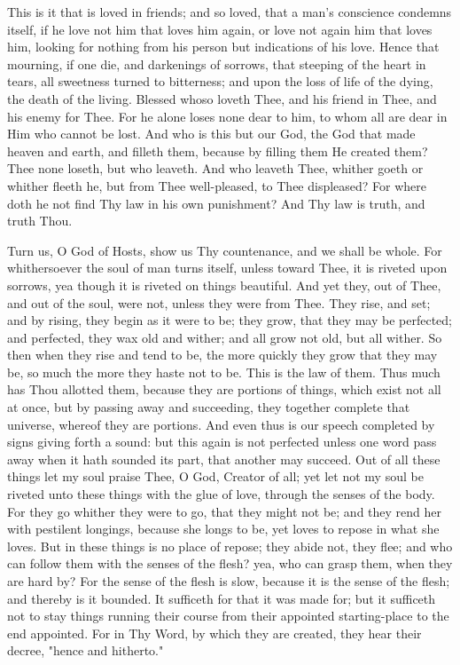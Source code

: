 \documentclass[b5paper,openright,12pt,twoside]{book}
\begin{document}
This is it that is loved in friends; and so loved, that a man's
conscience condemns itself, if he love not him that loves him again, or
love not again him that loves him, looking for nothing from his person
but indications of his love. Hence that mourning, if one die, and
darkenings of sorrows, that steeping of the heart in tears, all
sweetness turned to bitterness; and upon the loss of life of the dying,
the death of the living. Blessed whoso loveth Thee, and his friend in
Thee, and his enemy for Thee. For he alone loses none dear to him, to
whom all are dear in Him who cannot be lost. And who is this but our
God, the God that made heaven and earth, and filleth them, because by
filling them He created them? Thee none loseth, but who leaveth. And
who leaveth Thee, whither goeth or whither fleeth he, but from Thee
well-pleased, to Thee displeased? For where doth he not find Thy law in
his own punishment? And Thy law is truth, and truth Thou.

Turn us, O God of Hosts, show us Thy countenance, and we shall be whole.
For whithersoever the soul of man turns itself, unless toward Thee, it
is riveted upon sorrows, yea though it is riveted on things beautiful.
And yet they, out of Thee, and out of the soul, were not, unless they
were from Thee. They rise, and set; and by rising, they begin as it were
to be; they grow, that they may be perfected; and perfected, they wax
old and wither; and all grow not old, but all wither. So then when they
rise and tend to be, the more quickly they grow that they may be, so
much the more they haste not to be. This is the law of them. Thus much
has Thou allotted them, because they are portions of things, which
exist not all at once, but by passing away and succeeding, they together
complete that universe, whereof they are portions. And even thus is our
speech completed by signs giving forth a sound: but this again is not
perfected unless one word pass away when it hath sounded its part, that
another may succeed. Out of all these things let my soul praise Thee,
O God, Creator of all; yet let not my soul be riveted unto these things
with the glue of love, through the senses of the body. For they go
whither they were to go, that they might not be; and they rend her with
pestilent longings, because she longs to be, yet loves to repose in what
she loves. But in these things is no place of repose; they abide not,
they flee; and who can follow them with the senses of the flesh? yea,
who can grasp them, when they are hard by? For the sense of the flesh is
slow, because it is the sense of the flesh; and thereby is it bounded.
It sufficeth for that it was made for; but it sufficeth not to stay
things running their course from their appointed starting-place to the
end appointed. For in Thy Word, by which they are created, they hear
their decree, "hence and hitherto."
\end{document}
